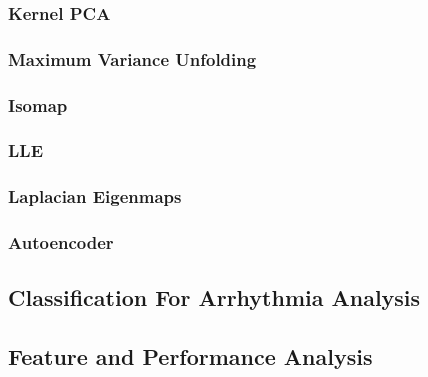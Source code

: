 \documentclass[journal]{IEEEtran}
\begin{document}
\lipsum[1]

\subsubsection{Kernel PCA}


\lipsum[1]


\subsubsection{Maximum Variance Unfolding}

\lipsum[1]


\subsubsection{Isomap}

\lipsum[1]

\subsubsection{LLE}

\lipsum[1]

\subsubsection{Laplacian Eigenmaps}

\lipsum[1]

\subsubsection{Autoencoder}

\lipsum[1-2]






\subsection{Classification For Arrhythmia Analysis}
\lipsum[1]

\subsection{Feature and Performance Analysis}

\lipsum[1]
\end{document}

